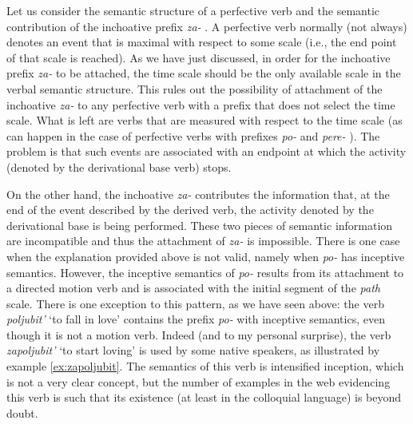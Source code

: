 Let us consider the semantic structure of a perfective verb  and the semantic contribution of the inchoative  prefix \textit{za-}  . A perfective verb  normally (not always) denotes an event that is maximal with respect to some scale (i.e., the end point of that scale is reached). As we have just discussed, in order for the inchoative  prefix \textit{za-}   to be attached, the time scale should be the only available scale in the verbal semantic structure. This rules out the possibility of attachment of the inchoative  \textit{za-}   to any perfective verb  with a prefix that does not select the time scale. What is left are verbs that are measured with respect to the time scale (as can happen in the case of perfective verbs  with prefixes \textit{po-}   and \textit{pere-}  ). The problem is that such events are associated with an endpoint at which the activity (denoted by the derivational base verb) stops. 

On the other hand, the inchoative  \textit{za-}   contributes the information that, at the end of the event described by the derived verb, the activity denoted by the derivational base is being performed. These two pieces of semantic information are incompatible and thus the attachment of \textit{za-}   is impossible. There is one case when the explanation provided above is not valid, namely when \textit{po-}   has inceptive  semantics. However, the inceptive  semantics of \textit{po-}   results from its attachment to a directed motion verb and is associated with the initial segment of the \textit{path} scale. There is one exception to this pattern, as we have seen above: the verb \textit{poljubit'} `to fall in love' contains the prefix \textit{po-}   with inceptive  semantics, even though it is not a motion verb. Indeed (and to my personal surprise), the verb \textit{zapoljubit'} `to start loving' is used by some native speakers, as illustrated by example \ref{ex:zapoljubit}. The semantics of this verb is intensified inception, which is not a very clear concept, but the number of examples in the web evidencing this verb is such that its existence (at least in the colloquial language) is beyond doubt.


